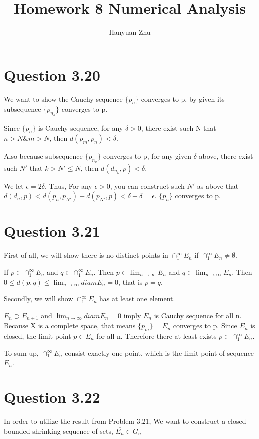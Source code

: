\documentclass{article}
\title{Homework 8 Numerical Analysis}
\author{Hanyuan Zhu}
\date{}
\begin{document}
\section*{Question 3.20}
We want to show the Cauchy sequence $\{ p_n\}$ converges to p, by given its subsequence $\{ p_{n_k}\}$ converges to p.

Since $\{ p_n \}$ is Cauchy sequence, for any $\delta >0$, there exist such N that $ n > N \& m > N $, then $ d(p_m,p_n) < \delta $.

Also because subsequence $\{ p_{n_k}\}$ converges to p,  for any given $\delta $ above, there exist such $N'$ that $ k > N' \leq N $, then
$ d(d_{n_k},p) < \delta $.

We let $ \epsilon = 2 \delta$. Thus, For any $\epsilon >0$, you can construct such $N'$ as above that $ d(d_n,p) <  d(p_n,p_{N'}) + d(p_{N'},p) < \delta + \delta = \epsilon $.
$\{p_n\}$ converges to  p.

\section*{Question 3.21}

First of all, we will show there is no distinct points in  $ \cap^{\infty}_1 E_n$ if  $ \cap^{\infty}_1 E_n \neq \emptyset $.

If  $  p\in \cap^{\infty}_1 E_n$ and  $ q \in \cap^{\infty}_1 E_n$. Then $p \in \lim_{n \rightarrow \infty} E_n $ and $q \in \lim_{n \rightarrow \infty} E_n $.
Then $ 0 \leq d(p,q) \leq \lim_{n \rightarrow \infty} diam E_n = 0 $, that is $p = q$.


Secondly, we will show $ \cap^{\infty}_1 E_n$ has at least one element.

$E_n \supset E_{n+1}$ and $\lim_{n \rightarrow \infty} diam E_n = 0 $ imply $ E_n $ is Cauchy sequence for all n.
Because X is a complete space, that means $\{ p_m \} = E_n $ converges to p. Since $E_n$ is closed,  the limit point $p \in E_n$ for all n.
Therefore there at least exists $ p \in \cap^{\infty}_1 E_n$.

To sum up, $\cap^{\infty}_1 E_n$ consist exactly one point, which is the limit point of sequence $ E_n$.

\section*{Question 3.22}

In order to utilize the result from Problem 3.21, We want to construct a closed bounded shrinking sequence of sets, $\overline{E_n} \in G_n$
\end{document}
